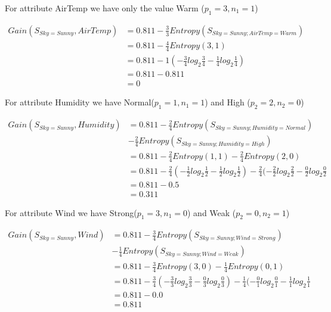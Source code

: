 \documentclass[10pt,a4paper]{article}
\begin{document}
{{{{{{{{{{For attribute AirTemp we have only the value Warm ($p_1=3,n_1=1$)

\begin{equation}
\begin{split}
Gain(S_{Sky=Sunny},AirTemp) &= 0.811 - \frac{3}{3} Entropy(S_{Sky=Sunny;AirTemp=Warm} )\\
          &= 0.811 - \frac{4}{4} Entropy(3,1) \\
          &= 0.811 - 1( -\frac{3}{4} log_2\frac{3}{4} -\frac{1}{4} log_2\frac{1}{4} )  \\
          &= 0.811 - 0.811  \\
          &= 0
\end{split}
\end{equation}

For attribute Humidity we have Normal($p_1=1,n_1=1$) and High ($p_2=2,n_2=0$)

\begin{equation}
\begin{split}
Gain(S_{Sky=Sunny},Humidity) &= 0.811 - \frac{2}{4} Entropy(S_{Sky=Sunny;Humidity=Normal} )\\
                                      &-\frac{2}{4}Entropy(S_{Sky=Sunny;Humidity=High})\\
          &= 0.811 - \frac{2}{4} Entropy(1,1) - \frac{2}{4}Entropy(2,0) \\
          &= 0.811 - \frac{2}{4}( -\frac{1}{2} log_2\frac{1}{2} -\frac{1}{2} log_2\frac{1}{2} ) 
                   - \frac{2}{4}( -\frac{2}{2} log_2\frac{2}{2} -\frac{0}{2} log_2\frac{0}{2} \\
          &= 0.811 - 0.5  \\
          &= 0.311
\end{split}
\end{equation}

For attribute Wind we have Strong($p_1=3,n_1=0$) and Weak ($p_2=0,n_2=1$)

\begin{equation}
\begin{split}
Gain(S_{Sky=Sunny},Wind) &= 0.811 - \frac{3}{4} Entropy(S_{Sky=Sunny;Wind=Strong} )\\
                                      &-\frac{1}{4}Entropy(S_{Sky=Sunny;Wind=Weak})\\
          &= 0.811 - \frac{3}{4} Entropy(3,0) - \frac{1}{4}Entropy(0,1) \\
          &= 0.811 - \frac{3}{4}( -\frac{3}{3} log_2\frac{3}{3} -\frac{0}{3} log_2\frac{0}{3} ) 
                   - \frac{1}{4}( -\frac{0}{1} log_2\frac{0}{1} -\frac{1}{1} log_2\frac{1}{1} \\
          &= 0.811 - 0.0  \\
          &= 0.811
\end{split}
\end{equation}

}}}}}}}}}}
\end{document}
